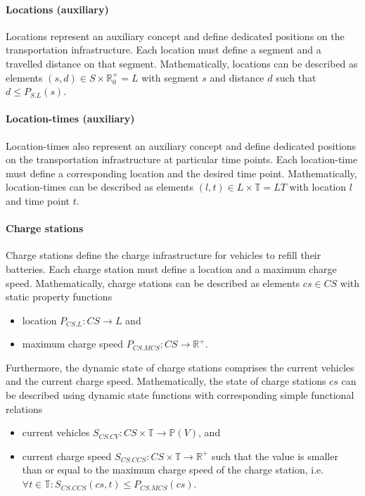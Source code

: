 \documentclass{article}
\begin{document}
    \paragraph{Locations (auxiliary)}
    Locations represent an auxiliary concept and define dedicated positions on the transportation infrastructure.
    Each location must define a segment and a travelled distance on that segment.
    Mathematically, locations can be described as elements $(s, d) \in S \times \mathbb{R}_0^+ = L$ with segment $s$ and distance $d$ such that $d \leq P_{S.L}(s)$.

    \paragraph{Location-times (auxiliary)}
    Location-times also represent an auxiliary concept and define dedicated positions on the transportation infrastructure at particular time points.
    Each location-time must define a corresponding location and the desired time point.
    Mathematically, location-times can be described as elements $(l, t) \in L \times \mathbb{T} = LT$ with location $l$ and time point $t$.

    \paragraph{Charge stations}
    Charge stations define the charge infrastructure for vehicles to refill their batteries.
    Each charge station must define a location and a maximum charge speed.
    Mathematically, charge stations can be described as elements $cs \in CS$ with static property functions
    \begin{itemize}
        \item location $P_{CS.L}: CS \rightarrow L$ and
        \item maximum charge speed $P_{CS.MCS}: CS \rightarrow \mathbb{R}^+$.
    \end{itemize}
    Furthermore, the dynamic state of charge stations comprises the current vehicles and the current charge speed.
    Mathematically, the state of charge stations $cs$ can be described using dynamic state functions with corresponding simple functional relations
    \begin{itemize}
        \item current vehicles $S_{CS.CV}: CS \times \mathbb{T} \rightarrow \mathbb{P}(V)$, and
        \item current charge speed $S_{CS.CCS}: CS \times \mathbb{T} \rightarrow \mathbb{R}^+$ such that the value is smaller than or equal to the maximum charge speed of the charge station, i.e.\ $\forall t \in \mathbb{T}: S_{CS.CCS}(cs,t) \leq P_{CS.MCS}(cs)$.
    \end{itemize}
\end{document}
